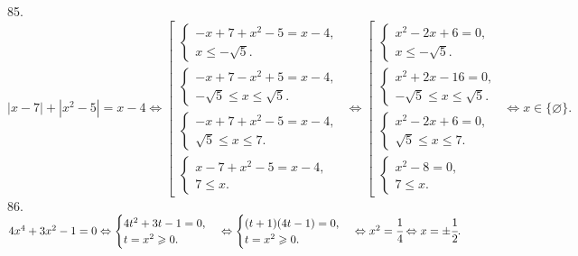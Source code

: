 85. $|x-7|+|x^2-5|=x-4\Leftrightarrow \left[\begin{array}{l}\begin{cases} -x+7+x^2-5=x-4,\\ x\leqslant -\sqrt{5}.\end{cases}\\
\begin{cases} -x+7-x^2+5=x-4,\\ -\sqrt{5}\leqslant x\leqslant \sqrt{5}.\end{cases}\\ \begin{cases} -x+7+x^2-5=x-4,\\ \sqrt{5}\leqslant x\leqslant7.\end{cases}\\
\begin{cases} x-7+x^2-5=x-4,\\ 7 \leqslant x.\end{cases}
\end{array}\right.\Leftrightarrow
\left[\begin{array}{l}\begin{cases} x^2-2x+6=0,\\ x\leqslant -\sqrt{5}.\end{cases}\\
\begin{cases} x^2+2x-16=0,\\ -\sqrt{5}\leqslant x\leqslant \sqrt{5}.\end{cases}\\ \begin{cases} x^2-2x+6=0,\\ \sqrt{5}\leqslant x\leqslant7.\end{cases}\\
\begin{cases} x^2-8=0,\\ 7 \leqslant x.\end{cases}
\end{array}\right.\Leftrightarrow x\in\{\varnothing\}.$\\
86. $4x^4+3x^2-1=0\Leftrightarrow\begin{cases}4t^2+3t-1=0,\\ t=x^2\geqslant0.\end{cases}\Leftrightarrow\begin{cases}(t+1)(4t-1)=0,\\ t=x^2\geqslant0.\end{cases}
\Leftrightarrow x^2=\cfrac{1}{4} \Leftrightarrow x=\pm\cfrac{1}{2}.$\\
